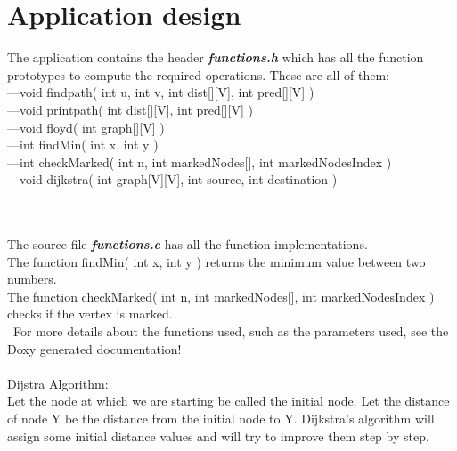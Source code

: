 \documentclass[14pt]{article}
\begin{document}
\section*{Application design}
\vspace{10 mm}
The application contains the header \textbf{\textit{functions.h}} which has all the function prototypes to compute the required operations. These are all of them:
\\---void findpath( int u, int v, int dist[][V], int pred[][V] )
\\---void printpath( int dist[][V], int pred[][V] )
\\---void floyd( int graph[][V] )
\\---int findMin( int x, int y )
\\---int checkMarked( int n, int markedNodes[], int markedNodesIndex )
\\---void dijkstra( int graph[V][V], int source, int destination )

\\\vspace{3 mm}
\\The source file \textbf{\textit{functions.c}} has all the function implementations.
\\The function findMin( int x, int y ) returns the minimum value between two numbers.
\\The function checkMarked( int n, int markedNodes[], int markedNodesIndex ) checks if the vertex is marked.
\\\ For more details about the functions used, such as the parameters used, see the Doxy generated documentation!
\\\vspace{3 mm}
\\Dijstra Algorithm:
\\ Let the node at which we are starting be called the initial node. Let the distance of node Y be the distance from the initial node to Y. Dijkstra's algorithm will assign some initial distance values and will try to improve them step by step.
\end{document}
